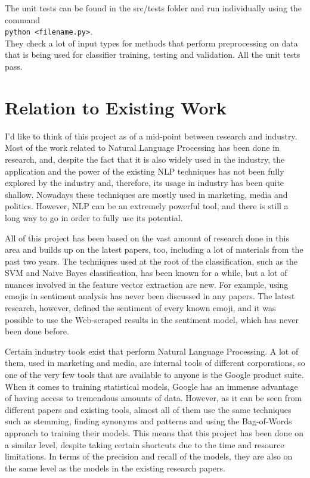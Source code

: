 The unit tests can be found in the src/tests folder and run individually using the command \\ \texttt{python <filename.py>}. \\ They check a lot of input types for methods that perform preprocessing on data that is being used for classifier training, testing and validation. All the unit tests pass. 


\section{Relation to Existing Work}
\label{sec:relation}

I'd like to think of this project as of a mid-point between research and industry. Most of the work related to Natural Language Processing has been done in research, and, despite the fact that it is also widely used in the industry, the application and the power of the existing NLP techniques has not been fully explored by the industry and, therefore, its usage in industry has been quite shallow. Nowadays these techniques are mostly used in marketing, media and politics. However, NLP can be an extremely powerful tool, and there is still a long way to go in order to fully use its potential.

All of this project has been based on the vast amount of research done in this area and builds up on the latest papers, too, including a lot of materials from the past two years. The techniques used at the root of the classification, such as the SVM and Naive Bayes classification, has been known for a while, but a lot of nuances involved in the feature vector extraction are new. For example, using emojis in sentiment analysis has never been discussed in any papers. The latest research, however, defined the sentiment of every known emoji, and it was possible to use the Web-scraped results in the sentiment model, which has never been done before. 

Certain industry tools exist that perform Natural Language Processing. A lot of them, used in marketing and media, are internal tools of different corporations, so one of the very few tools that are available to anyone is the Google product suite. When it comes to training statistical models, Google has an immense advantage of having access to tremendous amounts of data. However, as it can be seen from different papers and existing tools, almost all of them use the same techniques such as stemming, finding synonyms and patterns and using the Bag-of-Words approach to training their models. This means that this project has been done on a similar level, despite taking certain shortcuts due to the time and resource limitations. In terms of the precision and recall of the models, they are also on the same level as the models in the existing research papers. 